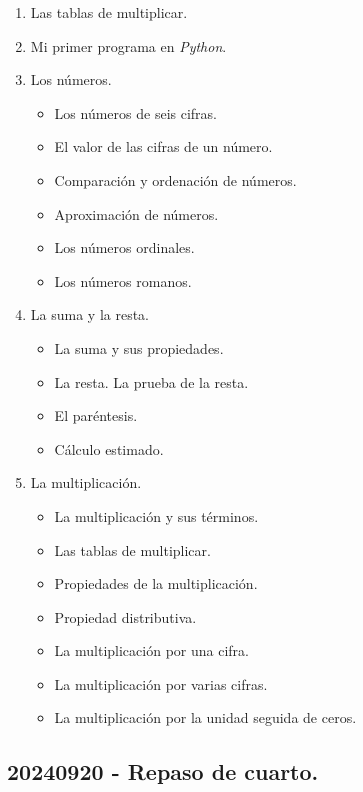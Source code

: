 \documentclass[a4paper,12pt]{article}
\begin{document}
\begin{enumerate}
    \item Las tablas de multiplicar.
    \item Mi primer programa en \textit{Python}.
    \item Los números.
    \begin{itemize}
        \item Los números de seis cifras.
        \item El valor de las cifras de un número.
        \item Comparación y ordenación de números.
        \item Aproximación de números.
        \item Los números ordinales.
        \item Los números romanos.
    \end{itemize}
    \item La suma y la resta.
    \begin{itemize}
        \item La suma y sus propiedades.
        \item La resta. La prueba de la resta.
        \item El paréntesis.
        \item Cálculo estimado.
    \end{itemize}
    \item La multiplicación.
    \begin{itemize}
        \item La multiplicación y sus términos.
        \item Las tablas de multiplicar.
        \item Propiedades de la multiplicación.
        \item Propiedad distributiva.
        \item La multiplicación por una cifra.
        \item La multiplicación por varias cifras.
        \item La multiplicación por la unidad seguida de ceros.
    \end{itemize}
\end{enumerate}

\subsection{20240920 - Repaso de cuarto.}
\end{document}
